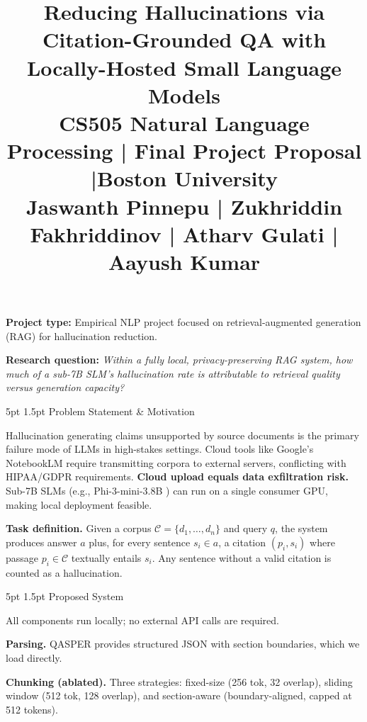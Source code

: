\documentclass[11pt,letterpaper]{article}
\title{\vspace{-1.5em}%
  \textbf{Reducing Hallucinations via Citation-Grounded QA
  with Locally-Hosted Small Language Models}\\[3pt]
  {\normalsize\normalfont
   CS505 Natural Language Processing \enspace|\enspace
   Final Project Proposal \enspace|\enspace Boston University}\\[1pt]
  {\normalsize\normalfont Jaswanth Pinnepu | Zukhriddin Fakhriddinov | Atharv Gulati | Aayush Kumar}%
}
\date{\vspace{-1.5em}}
\makeatletter
\renewcommand{\section}{\@startsection{section}{1}{\z@}%
  {5pt \@plus 1pt \@minus 1pt}{1.5pt}%
  {\normalfont\normalsize\bfseries}}
\makeatother
\begin{document}
\maketitle
\thispagestyle{empty}

\noindent\textbf{Project type:}
Empirical NLP project focused on retrieval-augmented generation (RAG) for
hallucination reduction.

\noindent\textbf{Research question:}
\emph{Within a fully local, privacy-preserving RAG system, how much of a
sub-7B SLM's hallucination rate is attributable to retrieval quality versus
generation capacity?}

\section{Problem Statement \& Motivation}

Hallucination generating claims unsupported by source documents is the
primary failure mode of LLMs in high-stakes settings.
Cloud tools like Google's NotebookLM require transmitting corpora to external
servers, conflicting with HIPAA/GDPR requirements.
\textbf{Cloud upload equals data exfiltration risk.}
Sub-7B SLMs (e.g., Phi-3-mini-3.8B \citep{microsoft2024phi3}) can run on a
single consumer GPU, making local deployment feasible.

\textbf{Task definition.}
Given a corpus $\mathcal{C}=\{d_1,\ldots,d_n\}$ and query $q$, the system
produces answer $a$ plus, for every sentence $s_i\in a$, a citation
$(p_i, s_i)$ where passage $p_i\in\mathcal{C}$ textually entails $s_i$.
Any sentence without a valid citation is counted as a hallucination.

\section{Proposed System}

All components run locally; no external API calls are required.

\textbf{Parsing.}  QASPER provides structured JSON with section boundaries,
which we load directly.

\textbf{Chunking (ablated).}  Three strategies: fixed-size (256 tok, 32 overlap),
sliding window (512 tok, 128 overlap), and section-aware
(boundary-aligned, capped at 512 tokens).
\end{document}
